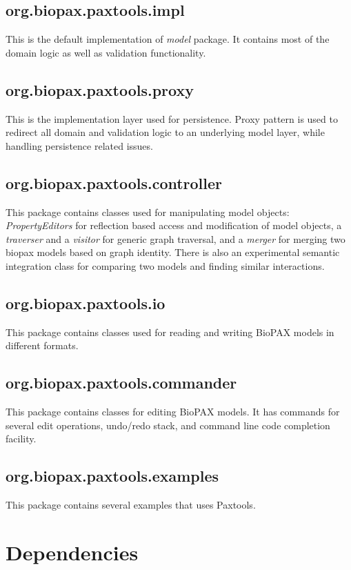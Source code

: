 \documentclass[10pt]{article}
\begin{document}
\subsection{org.biopax.paxtools.impl}
This is the default implementation of \emph{model} package. It contains most of the domain logic as well as validation functionality.

\subsection{org.biopax.paxtools.proxy}
This is the implementation layer used for persistence. Proxy pattern is used to redirect all domain and validation logic to an underlying model layer, while handling persistence related issues.

\subsection{org.biopax.paxtools.controller}
This package contains classes used for manipulating model objects: \emph{PropertyEditors} for reflection based access and modification of model
objects, a \emph{traverser} and a \emph{visitor} for generic graph traversal, and a \emph{merger} for merging two biopax models based on graph identity. There is
also an experimental semantic integration class for comparing two models and finding similar interactions.

\subsection{org.biopax.paxtools.io}
This package contains classes used for reading and writing BioPAX models in different formats.

\subsection{org.biopax.paxtools.commander}
This package contains classes for editing BioPAX models. It has commands for several edit operations, undo/redo stack, and command line code completion facility.

\subsection{org.biopax.paxtools.examples}
This package contains several examples that uses Paxtools.

\section{Dependencies}
\end{document}
